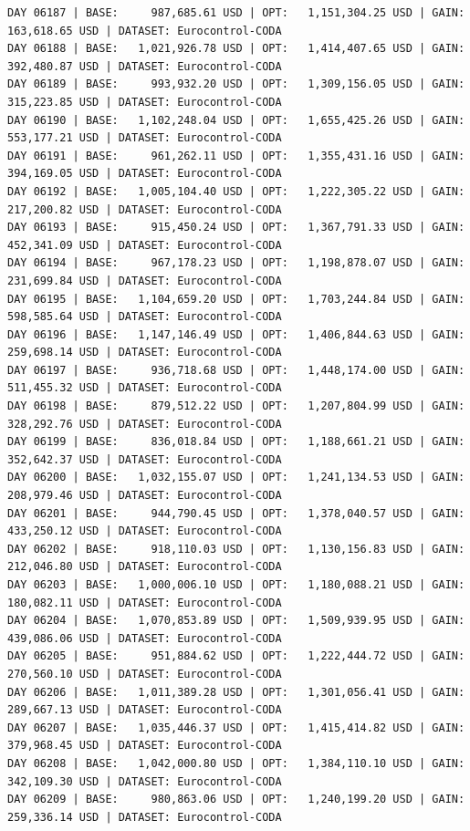 \documentclass[11pt,a4paper]{article}
\begin{document}
\begin{verbatim}
DAY 06187 | BASE:     987,685.61 USD | OPT:   1,151,304.25 USD | GAIN: 163,618.65 USD | DATASET: Eurocontrol-CODA
DAY 06188 | BASE:   1,021,926.78 USD | OPT:   1,414,407.65 USD | GAIN: 392,480.87 USD | DATASET: Eurocontrol-CODA
DAY 06189 | BASE:     993,932.20 USD | OPT:   1,309,156.05 USD | GAIN: 315,223.85 USD | DATASET: Eurocontrol-CODA
DAY 06190 | BASE:   1,102,248.04 USD | OPT:   1,655,425.26 USD | GAIN: 553,177.21 USD | DATASET: Eurocontrol-CODA
DAY 06191 | BASE:     961,262.11 USD | OPT:   1,355,431.16 USD | GAIN: 394,169.05 USD | DATASET: Eurocontrol-CODA
DAY 06192 | BASE:   1,005,104.40 USD | OPT:   1,222,305.22 USD | GAIN: 217,200.82 USD | DATASET: Eurocontrol-CODA
DAY 06193 | BASE:     915,450.24 USD | OPT:   1,367,791.33 USD | GAIN: 452,341.09 USD | DATASET: Eurocontrol-CODA
DAY 06194 | BASE:     967,178.23 USD | OPT:   1,198,878.07 USD | GAIN: 231,699.84 USD | DATASET: Eurocontrol-CODA
DAY 06195 | BASE:   1,104,659.20 USD | OPT:   1,703,244.84 USD | GAIN: 598,585.64 USD | DATASET: Eurocontrol-CODA
DAY 06196 | BASE:   1,147,146.49 USD | OPT:   1,406,844.63 USD | GAIN: 259,698.14 USD | DATASET: Eurocontrol-CODA
DAY 06197 | BASE:     936,718.68 USD | OPT:   1,448,174.00 USD | GAIN: 511,455.32 USD | DATASET: Eurocontrol-CODA
DAY 06198 | BASE:     879,512.22 USD | OPT:   1,207,804.99 USD | GAIN: 328,292.76 USD | DATASET: Eurocontrol-CODA
DAY 06199 | BASE:     836,018.84 USD | OPT:   1,188,661.21 USD | GAIN: 352,642.37 USD | DATASET: Eurocontrol-CODA
DAY 06200 | BASE:   1,032,155.07 USD | OPT:   1,241,134.53 USD | GAIN: 208,979.46 USD | DATASET: Eurocontrol-CODA
DAY 06201 | BASE:     944,790.45 USD | OPT:   1,378,040.57 USD | GAIN: 433,250.12 USD | DATASET: Eurocontrol-CODA
DAY 06202 | BASE:     918,110.03 USD | OPT:   1,130,156.83 USD | GAIN: 212,046.80 USD | DATASET: Eurocontrol-CODA
DAY 06203 | BASE:   1,000,006.10 USD | OPT:   1,180,088.21 USD | GAIN: 180,082.11 USD | DATASET: Eurocontrol-CODA
DAY 06204 | BASE:   1,070,853.89 USD | OPT:   1,509,939.95 USD | GAIN: 439,086.06 USD | DATASET: Eurocontrol-CODA
DAY 06205 | BASE:     951,884.62 USD | OPT:   1,222,444.72 USD | GAIN: 270,560.10 USD | DATASET: Eurocontrol-CODA
DAY 06206 | BASE:   1,011,389.28 USD | OPT:   1,301,056.41 USD | GAIN: 289,667.13 USD | DATASET: Eurocontrol-CODA
DAY 06207 | BASE:   1,035,446.37 USD | OPT:   1,415,414.82 USD | GAIN: 379,968.45 USD | DATASET: Eurocontrol-CODA
DAY 06208 | BASE:   1,042,000.80 USD | OPT:   1,384,110.10 USD | GAIN: 342,109.30 USD | DATASET: Eurocontrol-CODA
DAY 06209 | BASE:     980,863.06 USD | OPT:   1,240,199.20 USD | GAIN: 259,336.14 USD | DATASET: Eurocontrol-CODA

\end{verbatim}
\end{document}
